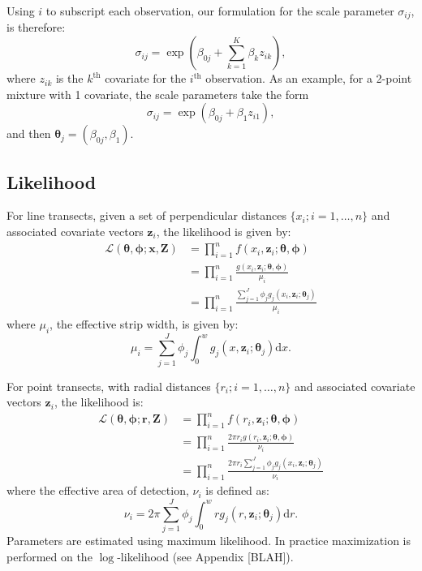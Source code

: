 \documentclass[useAMS,referee, usegraphicx]{biom}
\begin{document}
Using $i$ to subscript each observation, our formulation for the scale parameter $\sigma_{ij}$, is therefore:
\begin{equation*}
\sigma_{ij} = \exp( \beta_{0j} + \sum_{k=1}^K \beta_k z_{ik}),
\end{equation*}
where $z_{ik}$ is the $k^\text{th}$ covariate for the $i^\text{th}$ observation. As an example, for a 2-point mixture with 1 covariate, the scale parameters take the form
\begin{equation*}
\sigma_{ij} = \exp( \beta_{0j} + \beta_1 z_{i1}),
\end{equation*}
and then $\bm{\theta}_j = (\beta_{0j}, \beta_1)$. 


\subsection{Likelihood}

For line transects, given a set of perpendicular distances $\{x_i; i=1,\ldots,n\}$ and associated covariate vectors $\bm{z}_i$, the likelihood is given by:
\begin{align*}
\mathcal{L}(\bm{\theta},\bm{\phi}; \mathbf{x},\mathbf{Z}) &= \prod_{i=1}^n f(x_i,\bm{z}_i; \bm{\theta},\bm{\phi})\\
&= \prod_{i=1}^n \frac{g(x_i,\bm{z}_i; \bm{\theta},\bm{\phi})}{\mu_i}\\
&= \prod_{i=1}^n \frac{\sum_{j=1}^J \phi_j g_j(x_i,\bm{z}_i; \bm{\theta}_j)}{\mu_i}
\end{align*}
where $\mu_i$, the effective strip width, is given by:
\begin{equation*}
\mu_{i} = \sum_{j=1}^J \phi_j \int_0^w  g_j(x,\bm{z}_i; \bm{\theta}_j) \text{d}x.
\end{equation*}

For point transects, with radial distances $\{r_i; i=1,\ldots,n\}$ and associated covariate vectors $\bm{z}_i$, the likelihood is:
\begin{align*}
\mathcal{L}(\bm{\theta},\bm{\phi}; \mathbf{r},\mathbf{Z}) &= \prod_{i=1}^n f(r_i,\bm{z}_i; \bm{\theta},\bm{\phi})\\
&= \prod_{i=1}^n \frac{2 \pi r_i g(r_i,\bm{z}_i; \bm{\theta},\bm{\phi})}{\nu_i}\\
&= \prod_{i=1}^n \frac{2 \pi r_i \sum_{j=1}^J \phi_j g_j(x_i,\bm{z}_i; \bm{\theta}_j)}{\nu_i}
\end{align*}
where the effective area of detection, $\nu_i$ is defined as:
\begin{equation*}
\nu_i = 2\pi \sum_{j=1}^J \phi_j \int_0^w  r g_j(r,\bm{z}_i; \bm{\theta}_j) \text{d}r.
\end{equation*}
Parameters are estimated using maximum likelihood. In practice maximization is performed on the $\log$-likelihood (see Appendix [BLAH]). 
\end{document}
